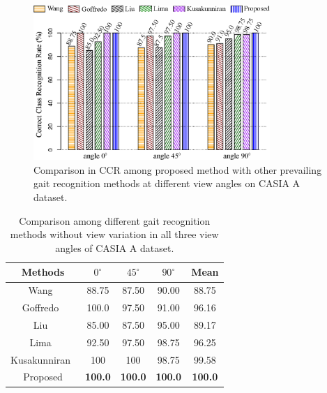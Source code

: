 \begin{figure}[t]
	\centering
	\includegraphics[width = 0.8\textwidth]{figures/casia_a_result.eps}
	\caption [Comparison in CCR among proposed method with other prevailing gait recognition methods at different view angles on CASIA A dataset]
	{Comparison in CCR among proposed method with other prevailing gait recognition methods at different view angles on CASIA A dataset. \label{fig:casia_a_result}
	}
	
\end{figure}

\begin{table}
	\centering
	\caption [Comparison among different gait recognition methods without view variation in all three view angles of CASIA A dataset]
	{Comparison among different gait recognition methods without view variation in all three view angles of CASIA A dataset. \label{table:casia_a_result}}
	{\begin{tabular*}{30pc}{@{\extracolsep{\fill}}ccccc}\hline
			
			Methods &${0^{\circ}}$ &${45^{\circ}}$   &${90^{\circ}}$  &Mean\\
			\hline
			
			Wang~\cite{Wang_03} &88.75 &87.50 &90.00 &88.75\\
			
			\noalign{\smallskip}
			Goffredo~\cite{Goffredo_08} &100.0 &97.50 &91.00 &96.16\\ 
			
			\noalign{\smallskip}
			Liu~\cite{Liu_16} &85.00 &87.50 &95.00 &89.17\\ 
			
			\noalign{\smallskip}
			Lima~\cite{Lima_19} &92.50 &97.50 &98.75 &96.25 \\
			
			\noalign{\smallskip}
			Kusakunniran~\cite{Kusakunniran_09} &100  &100  &98.75 &99.58 \\
			
			\noalign{\smallskip}
			Proposed &{\textbf{100.0}} & {\textbf{100.0}} &{\textbf{100.0}} & {\textbf{100.0}}\\
			\hline
	\end{tabular*}}{}
\end{table}


